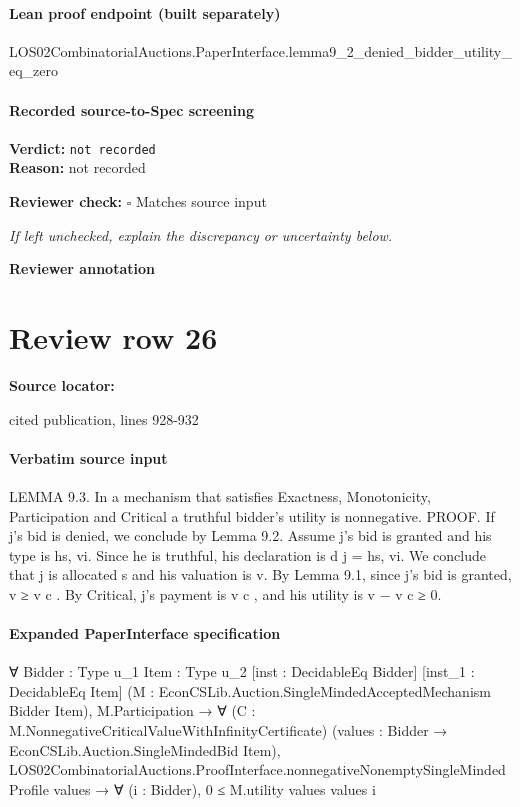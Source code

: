 \documentclass[10pt]{article}
\newcommand{\reviewerbox}{%
  \par\noindent\fbox{\parbox{0.96\linewidth}{\rule{0pt}{0.38in}}}\par
}
\newcommand{\reviewmatch}[1]{%
  \par\noindent\textbf{Reviewer check:} $\square$\; #1\par
  \noindent\emph{If left unchecked, explain the discrepancy or uncertainty below.}\par
}
\begin{document}
\paragraph{Lean proof endpoint (built separately)}\begin{ReviewVerbatim}
LOS02CombinatorialAuctions.PaperInterface.lemma9_2_denied_bidder_utility_eq_zero
\end{ReviewVerbatim}

\paragraph{Recorded source-to-Spec screening}
\textbf{Verdict:} \texttt{not recorded}
\\
\textbf{Reason:} not recorded
\reviewmatch{Matches source input}
\noindent\textbf{Reviewer annotation}\par
\reviewerbox
\clearpage
\hypertarget{source-claim-46c3e23a7fdc534c}{}
\section*{Review row 26}
\textbf{Source locator:} {\footnotesize\raggedright cited publication, lines 928-\allowbreak{}932\par}
\paragraph{Verbatim source input}
\begin{ReviewVerbatim}
LEMMA 9.3. In a mechanism that satisfies Exactness, Monotonicity, Participation and Critical a truthful bidder’s utility is nonnegative.
PROOF. If j’s bid is denied, we conclude by Lemma 9.2. Assume j’s bid is
granted and his type is hs, vi. Since he is truthful, his declaration is d j = hs, vi. We
conclude that j is allocated s and his valuation is v. By Lemma 9.1, since j’s bid
is granted, v ≥ v c . By Critical, j’s payment is v c , and his utility is v − v c ≥ 0.
\end{ReviewVerbatim}


\paragraph{Expanded PaperInterface specification}
\begin{ReviewVerbatim}
∀ {Bidder : Type u_1} {Item : Type u_2} [inst : DecidableEq Bidder] [inst_1 : DecidableEq Item]
  (M : EconCSLib.Auction.SingleMindedAcceptedMechanism Bidder Item),
  M.Participation →
    ∀ (C : M.NonnegativeCriticalValueWithInfinityCertificate)
      (values : Bidder → EconCSLib.Auction.SingleMindedBid Item),
      LOS02CombinatorialAuctions.ProofInterface.nonnegativeNonemptySingleMindedProfile values →
        ∀ (i : Bidder), 0 ≤ M.utility values values i
\end{ReviewVerbatim}
\end{document}
